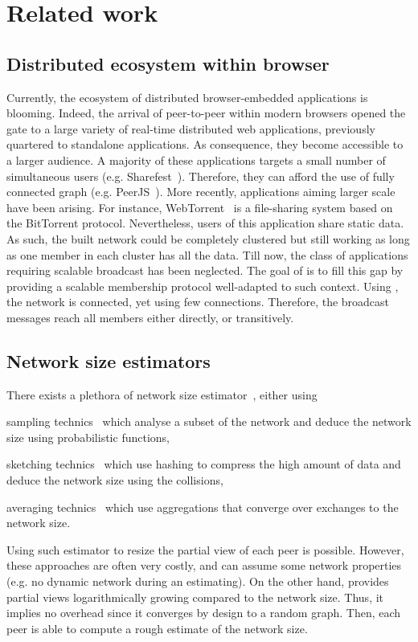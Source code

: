 
\section{Related work}
\label{sec:relatedwork}

\subsection{Distributed ecosystem within browser}
Currently, the ecosystem of distributed browser-embedded applications is
blooming. Indeed, the arrival of peer-to-peer within modern browsers opened the
gate to a large variety of real-time distributed web applications, previously
quartered to standalone applications. As consequence, they become accessible to
a larger audience. A majority of these applications targets a small number of
simultaneous users (e.g. Sharefest~\cite{sharefest}). Therefore, they can
afford the use of fully connected graph (e.g. PeerJS~\cite{peerjs}). More
recently, applications aiming larger scale have been arising. For instance,
WebTorrent~\cite{webtorrent} is a file-sharing system based on the BitTorrent
protocol. Nevertheless, users of this application share static data. As such,
the built network could be completely clustered but still working as long as
one member in each cluster has all the data.  Till now, the class of
applications requiring scalable broadcast has been neglected. The goal of
\SCAMPLON{} is to fill this gap by providing a scalable membership protocol
well-adapted to such context. Using \SCAMPLON{}, the network is connected, yet
using few connections. Therefore, the broadcast messages reach all members
either directly, or transitively.


\subsection{Network size estimators}
There exists a plethora of network size
estimator~\cite{kostoulas2007active,baquero2012extrema}, either using
\begin{inparaenum}[(i)]
\item sampling technics~\cite{ganesh2007peer,kostoulas2007active} which analyse
  a subset of the network and deduce the network size using probabilistic
  functions,
\item sketching technics~\cite{baquero2012extrema} which use hashing to
  compress the high amount of data and deduce the network size using the
  collisions,
\item averaging technics~\cite{jelasity2004epidemic} which use aggregations
  that converge over exchanges to the network size.
\end{inparaenum}
Using such estimator to resize the partial view of each peer is
possible. However, these approaches are often very costly, and can assume some
network properties (e.g. no dynamic network during an estimating). On the other
hand, \SCAMPLON{} provides partial views logarithmically growing compared to
the network size. Thus, it implies no overhead since it converges by design to
a random graph. Then, each peer is able to compute a rough estimate of the
network size.

